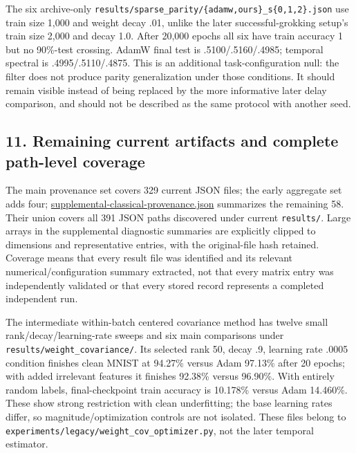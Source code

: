 \documentclass[
  british,
  10pt,
  a4paper,
]{article}
\begin{document}
The six archive-\allowbreak{}only
\texttt{results/\allowbreak{}sparse\_\allowbreak{}parity/\allowbreak{}\{\allowbreak{}adamw,\allowbreak{}ours\}\allowbreak{}\_\allowbreak{}s\{\allowbreak{}0,\allowbreak{}1,\allowbreak{}2\}\allowbreak{}.\allowbreak{}json}
use train size 1,000 and weight decay .01, unlike the later
successful-\allowbreak{}grokking setup's train size 2,000 and decay 1.0.
After 20,000 epochs all six have train accuracy 1 but no 90\%-test
crossing. AdamW final test is
.\allowbreak{}5100/\allowbreak{}.\allowbreak{}5160/\allowbreak{}.\allowbreak{}4985;
temporal spectral is
.\allowbreak{}4995/\allowbreak{}.\allowbreak{}5110/\allowbreak{}.\allowbreak{}4875.\allowbreak{}
This is an additional task-\allowbreak{}configuratio\allowbreak{}n null:
the filter does not produce parity generalization under those
conditions.\allowbreak{} It should remain visible instead of being
replaced by the more informative later delay comparison,\allowbreak{}
and should not be described as the same protocol with another seed.

\subsection{11. Remaining current artifacts and complete path-level
coverage}\label{classical-evidence--remaining-current-artifacts-and-complete-path-level-coverage}

The main provenance set covers 329 current JSON files; the early
aggregate set adds four;
\href{../analysis/supplemental-classical-provenance.json}{supplemental\allowbreak{}-\allowbreak{}classical-\allowbreak{}provenance.\allowbreak{}json}
summarizes the remaining 58. Their union covers all 391 JSON paths
discovered under current \texttt{results/}. Large arrays in the
supplemental diagnostic summaries are explicitly clipped to dimensions
and representative entries, with the original-\allowbreak{}file hash
retained. Coverage means that every result file was identified and its
relevant numerical/\allowbreak{}configuratio\allowbreak{}n summary
extracted, not that every matrix entry was independently validated or
that every stored record represents a completed independent run.

The intermediate within-\allowbreak{}batch centered covariance method
has twelve small
rank/\allowbreak{}decay/\allowbreak{}learning-\allowbreak{}rate sweeps
and six main comparisons under
\texttt{results/\allowbreak{}weight\_\allowbreak{}covariance/\allowbreak{}}.
Its selected rank 50, decay .9, learning rate .0005 condition finishes
clean MNIST at 94.27\% versus Adam 97.13\% after 20 epochs; with added
irrelevant features it finishes 92.38\% versus 96.90\%. With entirely
random labels, final-\allowbreak{}checkpoint train accuracy is 10.178\%
versus Adam 14.460\%. These show strong restriction with clean
underfitting; the base learning rates differ, so
magnitude/\allowbreak{}optimization\allowbreak{} controls are not
isolated. These files belong to
\texttt{experiments/\allowbreak{}legacy/\allowbreak{}weight\_\allowbreak{}cov\_\allowbreak{}optimizer.\allowbreak{}py},
not the later temporal estimator.
\end{document}
